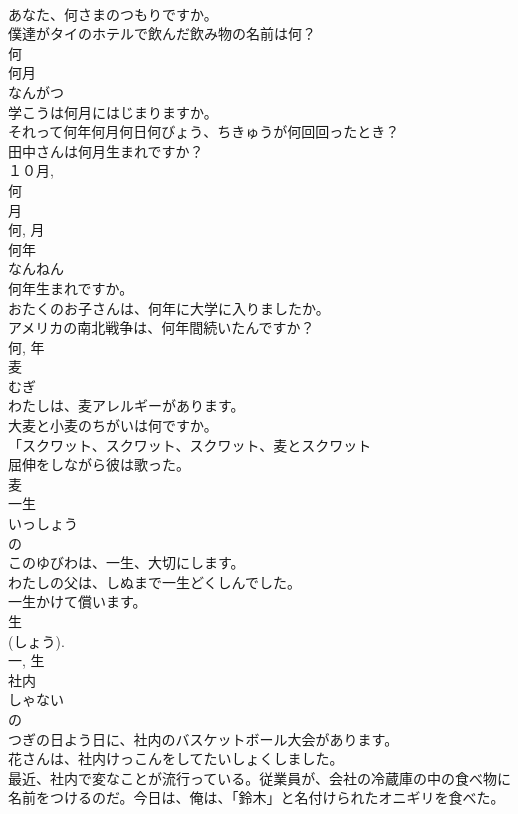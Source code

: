\documentclass[8pt]{extreport}
\begin{document}
\begin{CJK}{UTF8}{min}
\\	あなた、何さまのつもりですか。	
\\	僕達がタイのホテルで飲んだ飲み物の名前は何？	
\\	何	
\\	何月	
\\	なんがつ	
\\	学こうは何月にはじまりますか。	
\\	それって何年何月何日何びょう、ちきゅうが何回回ったとき？	
\\	田中さんは何月生まれですか？	
\\	１０月, 
\\	何 
\\	月 
\\	何, 月	
\\	何年	
\\	なんねん	
\\	何年生まれですか。	
\\	おたくのお子さんは、何年に大学に入りましたか。	
\\	アメリカの南北戦争は、何年間続いたんですか？	
\\	何, 年	
\\	麦	
\\	むぎ	
\\	わたしは、麦アレルギーがあります。	
\\	大麦と小麦のちがいは何ですか。	
\\	「スクワット、スクワット、スクワット、麦とスクワット
\\	屈伸をしながら彼は歌った。	
\\	麦	
\\	一生	
\\	いっしょう	
\\	の 
\\	このゆびわは、一生、大切にします。	
\\	わたしの父は、しぬまで一生どくしんでした。	
\\	一生かけて償います。	
\\	生 
\\	(しょう). 
\\	一, 生	
\\	社内	
\\	しゃない	
\\	の 
\\	つぎの日よう日に、社内のバスケットボール大会があります。	
\\	花さんは、社内けっこんをしてたいしょくしました。	
\\	最近、社内で変なことが流行っている。従業員が、会社の冷蔵庫の中の食べ物に名前をつけるのだ。今日は、俺は、「鈴木」と名付けられたオニギリを食べた。	

\end{CJK}
\end{document}
